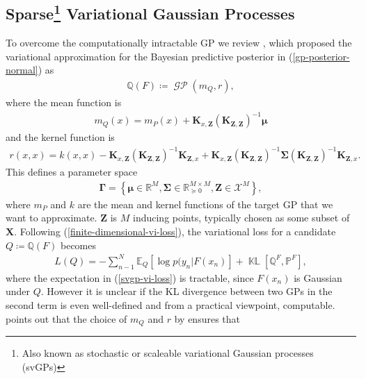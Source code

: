 \documentclass{article}
\newcommand{\KLD}{\operatorname{\mathbb{KL}}}
\newcommand{\GP}{\operatorname{\mathcal{GP}}}
\numberwithin{equation}{section}
\begin{document}
\subsection[Sparse Variational Gaussian Processes]{Sparse\footnote{Also known as stochastic or scaleable variational Gaussian processes (svGPs)} Variational Gaussian Processes}\label{section:svgp}
To overcome the computationally intractable GP we review \cite{titsias2009variational}, which proposed the variational approximation for the Bayesian predictive posterior in (\ref{gp-posterior-normal}) as
\begin{align}
    \mathbb{Q}(F) \coloneqq \GP(m_Q, r),
\end{align}
where the mean function is
\begin{align}
    \label{svgp-mean}
    m_Q(x) = m_P(x) + \mathbf{K}_{x, \mathbf{Z}}\left(\mathbf{K}_{\mathbf{Z}, \mathbf{Z}}\right)^{-1} \boldsymbol{\mu}
\end{align}
and the kernel function is
\begin{align}
r(x, x) = k(x, x) - \mathbf{K}_{x, \mathbf{Z}}\left(\mathbf{K}_{\mathbf{Z}, \mathbf{Z}}\right)^{-1} \mathbf{K}_{\mathbf{Z}, x} + \mathbf{K}_{x, \mathbf{Z}}\left(\mathbf{K}_{\mathbf{Z}, \mathbf{Z}}\right)^{-1}\mathbf{\Sigma}\left(\mathbf{K}_{\mathbf{Z}, \mathbf{Z}}\right)^{-1} \mathbf{K}_{\mathbf{Z}, x}.
\label{svgp-covariance}
\end{align}
This defines a parameter space
\begin{align}
    \mathbf{\Gamma} = \left\{\boldsymbol{\mu} \in \mathbb{R}^{M}, \mathbf{\Sigma} \in \mathbb{R}^{M\times M}_{\succcurlyeq 0}, \mathbf{Z} \in \mathcal{X}^M \right\},
    \label{svgp-parameter-space}
\end{align}
where $m_P$ and $k$ are the mean and kernel functions of the target GP that we want to approximate. $\mathbf{Z}$ is $M$ inducing points, typically chosen as some subset of $\mathbf{X}$.
Following (\ref{finite-dimensional-vi-loss}), the variational loss for a candidate $Q \coloneqq \mathbb{Q}(F)$ becomes
\begin{align}
L(Q) = -\sum_{n-1}^N \mathbb{E}_Q \left[\log p(y_n \vert F(x_n)\right] + \KLD\left[\mathbb{Q}^F, \mathbb{P}^F\right],
\label{svgp-vi-loss}
\end{align}
where the expectation in (\ref{svgp-vi-loss}) is tractable, since $F(x_n)$ is Gaussian under $Q$.
However it is unclear if the KL divergence between two GPs in the second term is even well-defined and from a practical viewpoint, computable.
\cite{matthews2016sparse} points out that the choice of $m_Q$ and $r$ by \cite{titsias2009variational} ensures that
\end{document}
